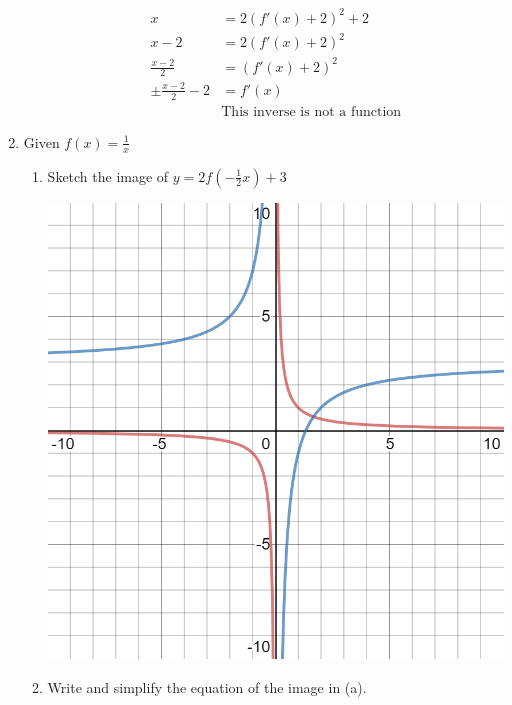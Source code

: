 \documentclass[paper=a4, fontsize=11pt]{scrartcl}
\begin{document}
\begin{enumerate}[resume]
\begin{enumerate}
\begin{align*}
                x&=2(f'(x)+2)^2+2\\
                x-2&=2(f'(x)+2)^2\\
                \frac{x-2}{2}&=(f'(x)+2)^2\\
                \pm\frac{x-2}{2}-2&=f'(x)\\
                &\text{This inverse is not a function}
            \end{align*}
        \end{enumerate}
    \item Given $f(x)=\frac{1}{x}$ 
    \begin{enumerate}
        \item Sketch the image of $y=2f(-\frac{1}{2}x)+3$
        
        \includegraphics[scale=0.1]{MathExamReview/35-graph.png}

        \item Write and simplify the equation of the image in (a).
        

\end{enumerate}
\end{enumerate}
\end{document}
